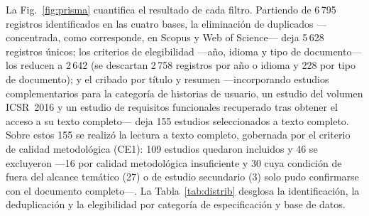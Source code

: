 \documentclass[10pt,journal,twoside,letterpaper]{IEEEtran}
\begin{document}
    La Fig.~\ref{fig:prisma} cuantifica el resultado de cada filtro. Partiendo de 6\,795 registros identificados en las cuatro bases, la eliminación de duplicados ---concentrada, como corresponde, en Scopus y Web of Science--- deja 5\,628 registros únicos; los criterios de elegibilidad ---año, idioma y tipo de documento--- los reducen a 2\,642 (se descartan 2\,758 registros por año o idioma y 228 por tipo de documento); y el cribado por título y resumen ---incorporando estudios complementarios para la categoría de historias de usuario, un estudio del volumen ICSR~2016 y un estudio de requisitos funcionales recuperado tras obtener el acceso a su texto completo--- deja 155 estudios seleccionados a texto completo. Sobre estos 155 se realizó la lectura a texto completo, gobernada por el criterio de calidad metodológica (CE1): 109 estudios quedaron incluidos y 46 se excluyeron ---16 por calidad metodológica insuficiente y 30 cuya condición de fuera del alcance temático (27) o de estudio secundario (3) solo pudo confirmarse con el documento completo---. La Tabla~\ref{tab:distrib} desglosa la identificación, la deduplicación y la elegibilidad por categoría de especificación y base de datos.
    
\end{document}
